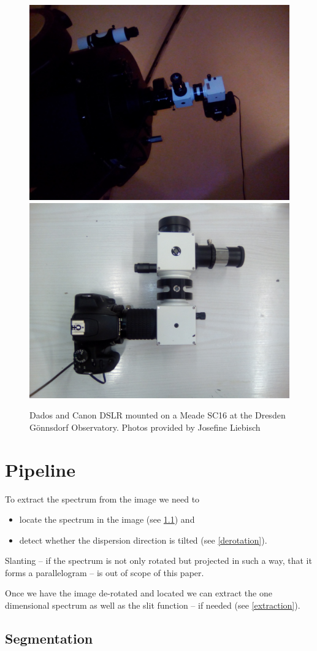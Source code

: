 \documentclass[10pt,a4paper,notitlepage]{article}
\begin{document}
	\begin{figure}[h]
	\includegraphics[width=0.49\columnwidth]{img/dados_nacht.jpg}
	\includegraphics[width=0.49\columnwidth]{img/dados_tag.jpg}
	
	\caption[orig]%
		{Dados and Canon DSLR mounted on a Meade SC16 at the Dresden Gönnsdorf Observatory. Photos provided by Josefine Liebisch}
\end{figure}
	

\section{Pipeline}
	
	To extract the spectrum from the image we need to 
	\begin{itemize}
		\item locate the spectrum in the image (see \ref{segmentation}) and
		\item detect whether the dispersion direction is tilted (see \ref{derotation}).
	\end{itemize}

	Slanting -- if the spectrum is not only rotated but projected in such a way, that it forms a parallelogram -- is out of scope of this paper.

	Once we have the image de-rotated and located we can extract the one dimensional spectrum as well as the slit function -- if needed (see \ref{extraction}).

	\subsection{Segmentation}
		\label{segmentation}
	
\end{document}
